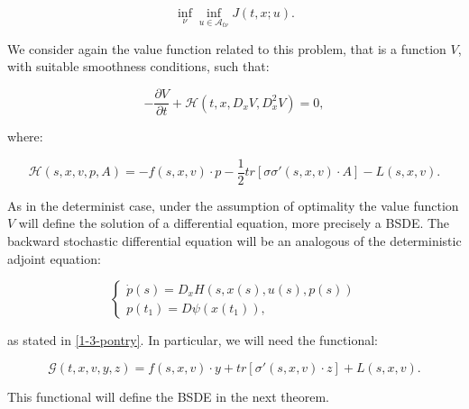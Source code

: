 \[\inf_{\nu}\inf_{u\in\mathcal{A}_{t\nu}} J(t,x;u).\]

We consider again the value function related to this problem, that is a function $V$, with suitable smoothness conditions, such that:

\begin{equation}
    -\frac{\partial V}{\partial t} + \mathcal{H}(t,x,D_xV,D_x^2V) = 0,
\end{equation}

where:

\begin{equation}
    \mathcal{H}(s,x,v,p,A) = - f(s,x,v)\cdot p - \frac{1}{2}tr\left[\sigma\sigma'(s,x,v)\cdot A\right] - L(s,x,v).
\end{equation}

As in the determinist case, under the assumption of optimality the value function $V$ will define the solution 
of a differential equation, more precisely a BSDE. The backward stochastic differential equation will be an 
analogous of the deterministic adjoint equation:

\[\begin{cases}
    \dot{p}(s) = D_xH(s,x(s),u(s),p(s)) \\
    p(t_1) = D\psi(x(t_1)),
\end{cases}\]

as stated in \ref{1-3-pontry}. In particular, we will need the functional:

\begin{equation}\label{3-2-defG}\mathcal{G}(t,x,v,y,z) = f(s,x,v)\cdot y + tr\left[\sigma'(s,x,v)\cdot z\right] + L(s,x,v).\end{equation}

This functional will define the BSDE in the next theorem.

